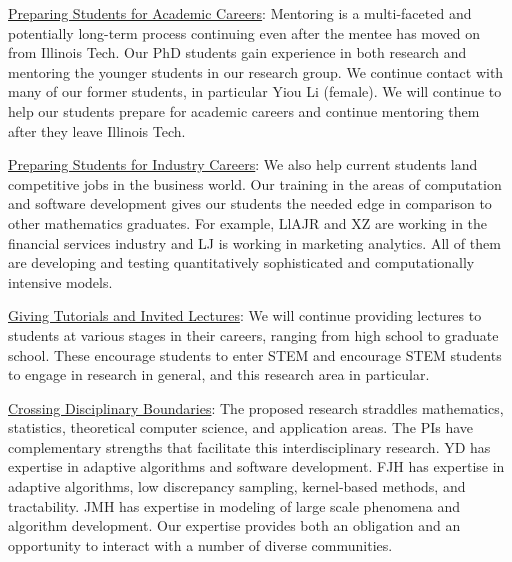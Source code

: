 \documentclass[11pt]{NSFamsart}
\newcommand{\Upara}[1]{\noindent\underline{\upshape #1}:}
\begin{document}
\Upara{Preparing Students for Academic Careers} 
Mentoring is a multi-faceted and 
potentially long-term process continuing even after the mentee has moved on from Illinois Tech.  
Our PhD students gain experience in both research and mentoring the younger students in our 
research group.  We 
continue contact with many of our former students, in particular Yiou Li (female).  We will continue to help our students prepare for 
academic careers and continue mentoring them after they leave Illinois Tech.

\Upara{Preparing Students for Industry Careers}
We also help current students land 
competitive jobs in the business world. Our training in the areas of computation and software 
development gives our students the needed edge in comparison to other mathematics 
graduates. For example, LlAJR and XZ are working in the financial services industry and  LJ is 
working in marketing analytics.  All of them are developing and testing quantitatively sophisticated and computationally intensive models. 

\Upara{Giving Tutorials and Invited Lectures}
We will continue providing lectures to students at various stages in their careers, ranging from high school to graduate school. These encourage students to enter STEM and encourage STEM students 
to engage in research in general, and this research area in particular.



\Upara{Crossing Disciplinary Boundaries} The proposed research straddles mathematics, statistics, theoretical computer science, and 
application areas.  The PIs have complementary strengths that facilitate this interdisciplinary research.  YD has expertise in adaptive algorithms and software development.  FJH has expertise in adaptive algorithms, low discrepancy sampling, kernel-based methods, and tractability. JMH has expertise in modeling of large scale phenomena and algorithm development.  Our 
expertise provides both an obligation and an opportunity to interact with a number of diverse 
communities.
\end{document}
